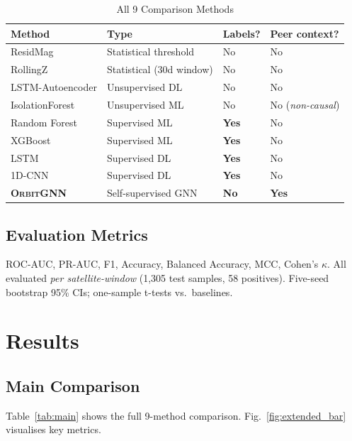 \documentclass[journal]{IEEEtran}
\newcommand{\orbitgnn}{\textsc{OrbitGNN}}
\begin{document}
\begin{table}[h]
\centering\caption{All 9 Comparison Methods}
\label{tab:methods}
\setlength\tabcolsep{4pt}
\begin{tabular}{@{}llll@{}}
\toprule
Method & Type & Labels? & Peer context? \\
\midrule
ResidMag        & Statistical threshold    & No  & No \\
RollingZ        & Statistical (30d window) & No  & No \\
LSTM-Autoencoder& Unsupervised DL          & No  & No \\
IsolationForest & Unsupervised ML          & No  & No (\emph{non-causal})\\
Random Forest   & Supervised ML            & \textbf{Yes} & No \\
XGBoost         & Supervised ML            & \textbf{Yes} & No \\
LSTM            & Supervised DL            & \textbf{Yes} & No \\
1D-CNN          & Supervised DL            & \textbf{Yes} & No \\
\textbf{\orbitgnn} & Self-supervised GNN   & \textbf{No}  & \textbf{Yes}\\
\bottomrule
\end{tabular}
\end{table}

\subsection{Evaluation Metrics}
ROC-AUC, PR-AUC, F1, Accuracy, Balanced Accuracy, MCC, Cohen's $\kappa$.
All evaluated \emph{per satellite-window} (1,305 test samples, 58 positives).
Five-seed bootstrap 95\% CIs; one-sample t-tests vs.\ baselines.

\section{Results}

\subsection{Main Comparison}

Table~\ref{tab:main} shows the full 9-method comparison.
Fig.~\ref{fig:extended_bar} visualises key metrics.
\end{document}
